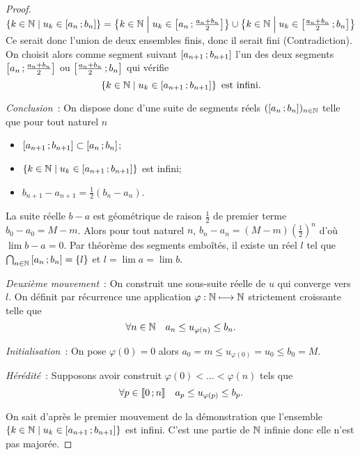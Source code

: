\begin{proof}
$\left\{k \in \mathbb{N}\mathrel{}\middle|\mathrel{}u_k \in \left[ a_n \, ;  b_n \right]\right\}= \left\{k \in \mathbb{N}\mathrel{}\middle|\mathrel{}u_k \in \left[ a_n \, ;  \frac{a_n+b_n}{2} \right]\right\} \cup \left\{k \in \mathbb{N}\mathrel{}\middle|\mathrel{}u_k \in \left[ \frac{a_n+b_n}{2} \, ;  b_n \right]\right\}$
Ce serait donc l'union de deux ensembles finis, donc il serait fini (Contradiction). On choisit alors comme segment suivant $\left[ a_{n+1} \, ;  b_{n+1} \right]$ l'un des deux segments $\left[ a_n \, ;  \frac{a_n+b_n}{2} \right]$ ou $\left[ \frac{a_n+b_n}{2} \, ;  b_n \right]$ qui vérifie
\begin{equation}
  \left\{k \in \mathbb{N}\mathrel{}\middle|\mathrel{}u_k \in \left[ a_{n+1} \, ;  b_{n+1} \right]\right\} \text{~est infini}.
\end{equation}

\emph{Conclusion}~: On dispose donc d'une suite de segments réels $(\left[ a_n \, ;  b_n \right])_{n \in \mathbb{N}}$ telle que pour tout naturel $n$
\begin{itemize}
\item $\left[ a_{n+1} \, ;  b_{n+1} \right] \subset \left[ a_{n} \, ;  b_{n} \right]$;
\item $\left\{k \in \mathbb{N}\mathrel{}\middle|\mathrel{}u_k \in \left[ a_{n+1} \, ;  b_{n+1} \right]\right\}$ est infini;
\item $b_{n+1}-a_{n+1}=\frac{1}{2}(b_n-a_n)$.
\end{itemize}

La suite réelle $b-a$ est géométrique de raison $\frac{1}{2}$ de premier terme $b_0-a_0=M-m$. Alors pour tout naturel $n$, $b_n-a_n=(M-m) \left(\frac{1}{2}\right)^n$ d'où $\lim b-a=0$. Par théorème des segments emboîtés, il existe un réel $l$ tel que $\bigcap_{n \in \mathbb{N}} \left[ a_{n} \, ;  b_{n} \right]=\{l\}$ et $l=\lim a = \lim b$.

\emph{Deuxième mouvement}~: On construit une sous-suite réelle de $u$ qui converge vers $l$. On définit par récurrence une application $\varphi : \mathbb{N} \longmapsto \mathbb{N}$ strictement croissante telle que
\begin{equation}
  \forall n \in \mathbb{N} \quad a_n \leq u_{\varphi(n)} \leq b_n.
\end{equation}

\emph{Initialisation}~: On pose $\varphi(0)=0$ alors $a_0=m \leq u_{\varphi(0)}=u_{0} \leq b_0=M$.

\emph{Hérédité}~: Supposons avoir construit $\varphi(0) < \ldots < \varphi(n)$ tels que
\begin{equation}
  \forall p \in \mathopen{\llbracket}0\mathclose{}\mathpunct{};n\mathclose{\rrbracket} \quad a_p \leq u_{\varphi(p)} \leq b_p.
\end{equation}

On sait d'après le premier mouvement de la démonstration que l'ensemble $\left\{k \in \mathbb{N}\mathrel{}\middle|\mathrel{}u_k \in \left[ a_{n+1} \, ;  b_{n+1} \right]\right\}$ est infini. C'est une partie de $\mathbb{N}$ infinie donc elle n'est pas majorée.


\end{proof}
